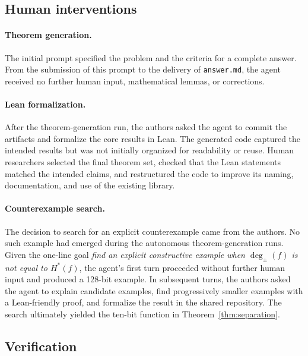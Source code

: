 \documentclass{article}
\theoremstyle{definition}
\theoremstyle{plain}
\newcommand{\hstar}{H^{\ast}}
\newcommand{\tdeg}{\deg_{\pm}}
\begin{document}
\subsection{Human interventions}
\label{subsec:human-interventions}


\paragraph{Theorem generation.}
The initial prompt specified the problem and the criteria for a complete answer. From the submission of this prompt to the delivery of \texttt{answer.md}, the agent received no further human input, mathematical lemmas, or corrections.

\paragraph{Lean formalization.}
After the theorem-generation run, the authors asked the agent to commit the artifacts and formalize the core results in Lean. The generated code captured the intended results but was not initially organized for readability or reuse. Human researchers selected the final theorem set, checked that the Lean statements matched the intended claims, and restructured the code to improve its naming, documentation, and use of the existing library.

\paragraph{Counterexample search.}
The decision to search for an explicit counterexample came from the authors. No such example had emerged during the autonomous theorem-generation runs. Given the one-line goal \emph{find an explicit constructive example when $\tdeg(f)$ is not equal to $\hstar(f)$}, the agent's first turn proceeded without further human input and produced a 128-bit example. In subsequent turns, the authors asked the agent to explain candidate examples, find progressively smaller examples with a Lean-friendly proof, and formalize the result in the shared repository. The search ultimately yielded the ten-bit function in Theorem~\ref{thm:separation}.

\subsection{Verification}
\end{document}
